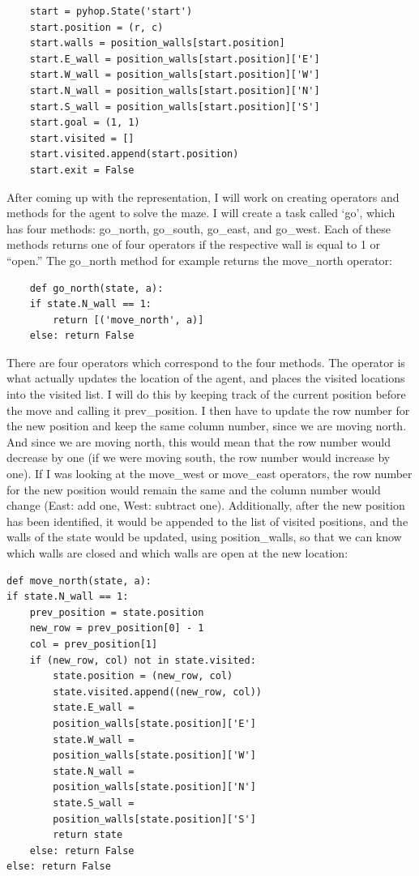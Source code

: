 \documentclass[10pt,twocolumn]{article}
\begin{document}
\begin{verbatim}
    start = pyhop.State('start')
    start.position = (r, c)
    start.walls = position_walls[start.position]
    start.E_wall = position_walls[start.position]['E']
    start.W_wall = position_walls[start.position]['W']
    start.N_wall = position_walls[start.position]['N']
    start.S_wall = position_walls[start.position]['S']
    start.goal = (1, 1)
    start.visited = []
    start.visited.append(start.position)
    start.exit = False
\end{verbatim}

After coming up with the representation, I will work on creating operators and methods for the agent to solve the maze. I will create a task called ‘go’, which has four methods: go\_north, go\_south, go\_east, and go\_west. Each of these methods returns one of four operators if the respective wall is equal to 1 or “open.” The go\_north method for example returns the move\_north operator:

\begin{verbatim}
    def go_north(state, a):
    if state.N_wall == 1:
        return [('move_north', a)]
    else: return False
\end{verbatim}

There are four operators which correspond to the four methods. The operator is what actually updates the location of the agent, and places the visited locations into the visited list. I will do this by keeping track of the current position before the move and calling it prev\_position. I then have to update the row number for the new position and keep the same column number, since we are moving north. And since we are moving north, this would mean that the row number would decrease by one (if we were moving south, the row number would increase by one). If I was looking at the move\_west or move\_east operators, the row number for the new position would remain the same and the column number would change (East: add one, West: subtract one).  Additionally, after the new position has been identified, it would be appended to the list of visited positions, and the walls of the state would be updated, using position\_walls, so that we can know which walls are closed and which walls are open at the new location:

\begin{verbatim}
def move_north(state, a):
if state.N_wall == 1:
    prev_position = state.position
    new_row = prev_position[0] - 1
    col = prev_position[1]
    if (new_row, col) not in state.visited:
        state.position = (new_row, col)
        state.visited.append((new_row, col))
        state.E_wall = 
        position_walls[state.position]['E']
        state.W_wall = 
        position_walls[state.position]['W']
        state.N_wall = 
        position_walls[state.position]['N']
        state.S_wall = 
        position_walls[state.position]['S']
        return state
    else: return False
else: return False
\end{verbatim}
\end{document}
